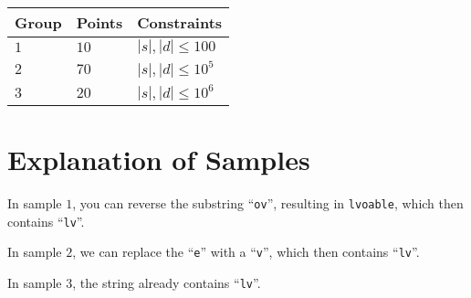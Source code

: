 \noindent
\begin{tabular}{| l | l | p{12cm} |}
  \hline
  \textbf{Group} & \textbf{Points} & \textbf{Constraints} \\ \hline
  $1$    & $10$       & $|s|,|d| \leq 100$ \\ \hline
  $2$    & $70$       & $|s|,|d| \leq 10^5$ \\ \hline
  $3$    & $20$       & $|s|,|d| \leq 10^6$ \\ \hline
\end{tabular}

\section*{Explanation of Samples}
In sample $1$, you can reverse the substring ``\texttt{ov}'', resulting in \texttt{lvoable}, which then contains
``\texttt{lv}''.

In sample $2$, we can replace the ``\texttt{e}'' with a ``\texttt{v}'', which then contains ``\texttt{lv}''.

In sample $3$, the string already contains ``\texttt{lv}''.

